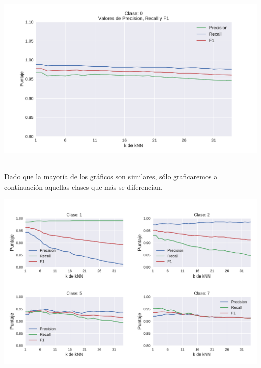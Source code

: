 {\centering
    \includegraphics[scale=0.55]{informe/imagenes/knn/precisionClase0.pdf} \\
}
$ $\newline

Dado que la mayoría de los gráficos son similares, sólo graficaremos a continuación aquellas clases que más se diferencian.

{\centering
    \includegraphics[scale=0.70]{informe/imagenes/knn/precisionClase1257.pdf} \\
    \label{fig:knnclasesvariacion}
}
$ $\newline

